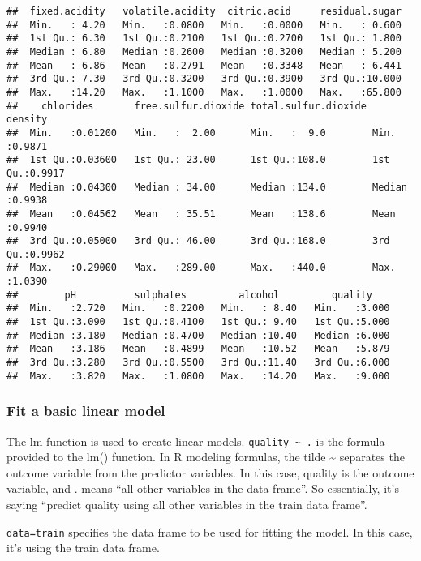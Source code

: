 \documentclass[
]{article}
\begin{document}
\begin{verbatim}
##  fixed.acidity   volatile.acidity  citric.acid     residual.sugar  
##  Min.   : 4.20   Min.   :0.0800   Min.   :0.0000   Min.   : 0.600  
##  1st Qu.: 6.30   1st Qu.:0.2100   1st Qu.:0.2700   1st Qu.: 1.800  
##  Median : 6.80   Median :0.2600   Median :0.3200   Median : 5.200  
##  Mean   : 6.86   Mean   :0.2791   Mean   :0.3348   Mean   : 6.441  
##  3rd Qu.: 7.30   3rd Qu.:0.3200   3rd Qu.:0.3900   3rd Qu.:10.000  
##  Max.   :14.20   Max.   :1.1000   Max.   :1.0000   Max.   :65.800  
##    chlorides       free.sulfur.dioxide total.sulfur.dioxide    density      
##  Min.   :0.01200   Min.   :  2.00      Min.   :  9.0        Min.   :0.9871  
##  1st Qu.:0.03600   1st Qu.: 23.00      1st Qu.:108.0        1st Qu.:0.9917  
##  Median :0.04300   Median : 34.00      Median :134.0        Median :0.9938  
##  Mean   :0.04562   Mean   : 35.51      Mean   :138.6        Mean   :0.9940  
##  3rd Qu.:0.05000   3rd Qu.: 46.00      3rd Qu.:168.0        3rd Qu.:0.9962  
##  Max.   :0.29000   Max.   :289.00      Max.   :440.0        Max.   :1.0390  
##        pH          sulphates         alcohol         quality     
##  Min.   :2.720   Min.   :0.2200   Min.   : 8.40   Min.   :3.000  
##  1st Qu.:3.090   1st Qu.:0.4100   1st Qu.: 9.40   1st Qu.:5.000  
##  Median :3.180   Median :0.4700   Median :10.40   Median :6.000  
##  Mean   :3.186   Mean   :0.4899   Mean   :10.52   Mean   :5.879  
##  3rd Qu.:3.280   3rd Qu.:0.5500   3rd Qu.:11.40   3rd Qu.:6.000  
##  Max.   :3.820   Max.   :1.0800   Max.   :14.20   Max.   :9.000
\end{verbatim}

\hypertarget{fit-a-basic-linear-model}{%
\subsubsection{Fit a basic linear
model}\label{fit-a-basic-linear-model}}

The lm function is used to create linear models.
\texttt{quality\ \textasciitilde{}\ .} is the formula provided to the
lm() function. In R modeling formulas, the tilde \textasciitilde{}
separates the outcome variable from the predictor variables. In this
case, quality is the outcome variable, and . means ``all other variables
in the data frame''. So essentially, it's saying ``predict quality using
all other variables in the train data frame''.

\texttt{data=train} specifies the data frame to be used for fitting the
model. In this case, it's using the train data frame.
\end{document}
